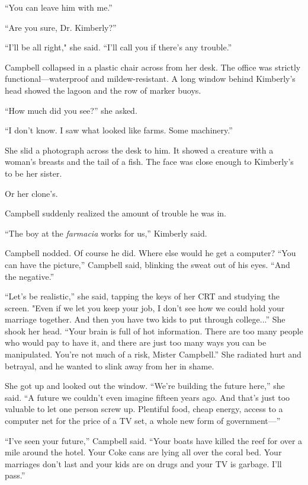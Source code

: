 ``You can leave him with me.''

``Are you sure, Dr. Kimberly?''

``I'll be all right," she said. ``I'll call you if there's any trouble.''

Campbell collapsed in a plastic chair across from her desk. The office was strictly functional---waterproof and mildew-resistant. A long window behind Kimberly's head showed the lagoon and the row of marker buoys.

``How much did you see?'' she asked.

``I don't know. I saw what looked like farms. Some machinery.''

She slid a photograph across the desk to him. It showed a creature with a woman's breasts and the tail of a fish. The face was close enough to Kimberly's to be her sister.

Or her clone's.

Campbell suddenly realized the amount of trouble he was in.

``The boy at the \textit{farmacia} works for us,'' Kimberly said.

Campbell nodded. Of course he did. Where else would he get a computer? ``You can have the picture,'' Campbell said, blinking the sweat out of his eyes. ``And the negative.''

``Let's be realistic,'' she said, tapping the keys of her CRT and studying the screen. "Even if we let you keep your job, I don't see how we could hold your marriage together. And then you have two kids to put through college...'' She shook her head. ``Your brain is full of hot information. There are too many people who would pay to have it, and there are just too many ways you can be manipulated. You're not much of a risk, Mister Campbell.'' She radiated hurt and betrayal, and he wanted to slink away from her in shame.

She got up and looked out the window. ``We're building the future here,'' she said. ``A future we couldn't even imagine fifteen years ago. And that's just too valuable to let one person screw up. Plentiful food, cheap energy, access to a computer net for the price of a TV set, a whole new form of government---''

``I've seen your future,'' Campbell said. ``Your boats have killed the reef for over a mile around the hotel. Your Coke cans are lying all over the coral bed. Your marriages don't last and your kids are on drugs and your TV is garbage. I'll pass.''

